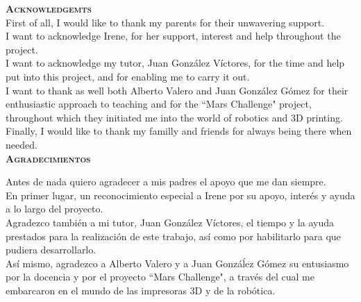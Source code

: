 
\vspace*{2cm}
\color{part} \textsc{\Large \textbf{Acknowledgemts}}\\[0.5cm]
\color{black}
First of all, I would like to thank my parents for their unwavering support.\\

I want to acknowledge Irene, for her support, interest and help throughout the project.\\

I want to acknowledge my tutor, Juan González Víctores, for the time and help put into this project, and for enabling me to carry it out.\\

I want to thank as well both Alberto Valero and Juan González Gómez for their enthusiastic approach to teaching and for the ``Mars Challenge" project, throughout which they initiated me into the world of robotics and 3D printing.\\

Finally, I would like to thank my familly and friends for always being there when needed.\\[1cm]

\vspace*{1cm}
\color{part} \textsc{\Large \textbf{Agradecimientos}}\\[0.5cm]
\color{black}

Antes de nada quiero agradecer a mis padres el apoyo que me dan siempre. \\

En primer lugar, un reconocimiento especial a Irene por su apoyo, interés y ayuda a lo largo del proyecto.\\

Agradezco también a mi tutor, Juan González Víctores, el tiempo y la ayuda prestados para la realización de este trabajo, así como por habilitarlo para que pudiera desarrollarlo.\\

Así mismo, agradezco a Alberto Valero y a Juan Gonzáĺez Gómez su entusiasmo por la docencia y por el proyecto ``Mars Challenge", a través del cual me embarcaron en el mundo de las impresoras 3D y de la robótica.\\

